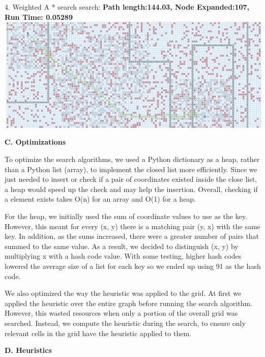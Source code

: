\documentclass[12pt, letterpaper]{article}
\begin{document}
4. Weighted A * search search:\newline
\medskip
\textbf{Path length:144.03, Node Expanded:107,	Run Time: 0.05289}\newline
\noindent \includegraphics[scale=0.2]{"b-map5-1-w-2"}\newline


\pagebreak %

\noindent \textbf{C. Optimizations}

To optimize the search algorithms, we used a Python dictionary as a heap, rather than a Python list (array), to implement the closed list more efficiently. Since we just needed to insert or check if a pair of coordinates existed inside the close list, a heap would speed up the check and may help the insertion. Overall, checking if a element exists takes O(n) for an array and O(1) for a heap.

For the heap, we initially used the sum of coordinate values to use as the key. However, this meant for every (x, y) there is a matching pair (y, x) with the same key. In addition, as the sums increased, there were a greater number of pairs that summed to the same value. As a result, we decided to distinguish (x, y) by multiplying x with a hash code value. With some testing, higher hash codes lowered the average size of a list for each key so we ended up using 91 as the hash code. 

We also optimized the way the heuristic was applied to the grid. At first we applied the heuristic over the entire graph before running the search algorithm. However, this wasted resources when only a portion of the overall grid was searched. Instead, we compute the heuristic during the search, to ensure only relevant cells in the grid have the heuristic applied to them.

\pagebreak %

\noindent \textbf{D. Heuristics}
\end{document}
